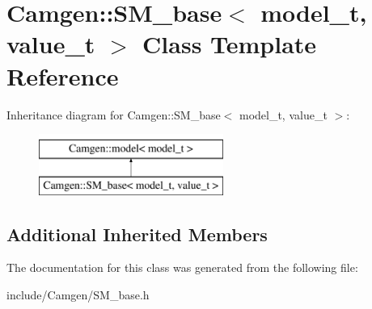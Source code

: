 \hypertarget{a00512}{}\section{Camgen\+:\+:S\+M\+\_\+base$<$ model\+\_\+t, value\+\_\+t $>$ Class Template Reference}
\label{a00512}
Inheritance diagram for Camgen\+:\+:S\+M\+\_\+base$<$ model\+\_\+t, value\+\_\+t $>$\+:\begin{figure}[H]
\begin{center}
\leavevmode
\includegraphics[height=2.000000cm]{a00512}
\end{center}
\end{figure}
\subsection*{Additional Inherited Members}


The documentation for this class was generated from the following file\+:\begin{DoxyCompactItemize}
\item 
include/\+Camgen/S\+M\+\_\+base.\+h\end{DoxyCompactItemize}
